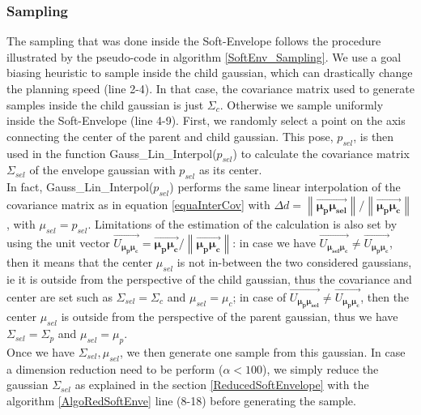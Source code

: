 \documentclass[letterpaper, 10 pt, conference]{ieeeconf}  %
\newcommand{\mb}[1]{{\boldsymbol{#1}}}
\newcommand\norm[1]{\left\lVert#1\right\rVert}
\begin{document}
\subsubsection{Sampling}\leavevmode\par
The sampling that was done inside the Soft-Envelope follows the procedure illustrated by the pseudo-code in algorithm \ref{SoftEnv_Sampling}.
We use a goal biasing heuristic to sample inside the child gaussian, which can drastically change the planning speed (line 2-4). In that case, the covariance matrix used to generate samples inside the child gaussian is just $\Sigma_c$. Otherwise we sample uniformly inside the Soft-Envelope (line 4-9).  First, we randomly select a point on the axis connecting the center of the parent and child gaussian. This pose, $p_{sel}$, is then used in the function {\selectfont Gauss\_Lin\_Interpol($p_{sel}$)} to calculate the covariance matrix $\Sigma_{sel}$  of the envelope gaussian with $p_{sel}$ as its center.\\
In fact, {\selectfont Gauss\_Lin\_Interpol($p_{sel}$)} performs the same linear interpolation of the covariance matrix as in equation \ref{equaInterCov} with $\Delta d = \norm{\overrightarrow{\mb{\mu_p}\mb{\mu_{sel}}}}/{\norm{\overrightarrow{\mb{\mu_p}\mb{\mu_c}}}}$, with $\mu_{sel} = p_{sel}$. Limitations of the estimation of the calculation is also set by using the unit vector $\overrightarrow{U_{\mb{\mu_p}\mb{\mu_{c}}}} = \overrightarrow{\mb{\mu_p}\mb{\mu_{c}}}/\norm{\overrightarrow{\mb{\mu_p}\mb{\mu_{c}}}}$: in case we have $\overrightarrow{U_{\mb{\mu_{sel}}\mb{\mu_{c}}}} \neq \overrightarrow{U_{\mb{\mu_p}\mb{\mu_{c}}}} $, then it means that the center $\mu_{sel}$ is not in-between the two considered gaussians, ie it is outside from the perspective of the child gaussian, thus the covariance and center are set such as $\Sigma_{sel}=\Sigma_c$ and $\mu_{sel}=\mu_c$; in case of $\overrightarrow{U_{\mb{\mu_{p}}\mb{\mu_{sel}}}} \neq \overrightarrow{U_{\mb{\mu_p}\mb{\mu_{c}}}} $, then the center $\mu_{sel}$ is outside from the perspective of the parent gaussian, thus we have $\Sigma_{sel}=\Sigma_p$ and $\mu_{sel}=\mu_p$.\\
Once we have $\Sigma_{sel}, \mu_{sel}$, we then generate one sample from this gaussian. In case a dimension reduction need to be perform ($\alpha<100$), we simply reduce the gaussian $\Sigma_{sel}$ as explained in the section \ref{ReducedSoftEnvelope} with the algorithm \ref{AlgoRedSoftEnve} line (8-18) before generating the sample. 
\\
\end{document}

